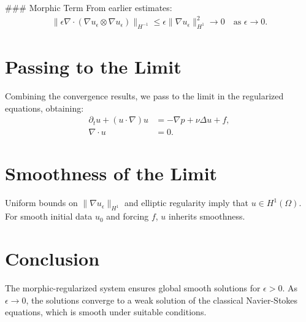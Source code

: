 \documentclass[12pt]{article}
\begin{document}
### Morphic Term
From earlier estimates:
\begin{align}
    \|\epsilon \nabla \cdot (\nabla u_\epsilon \otimes \nabla u_\epsilon)\|_{H^{-1}} \leq \epsilon \|\nabla u_\epsilon\|_{H^1}^2 \to 0 \quad \text{as } \epsilon \to 0.
\end{align}

\section{Passing to the Limit}
Combining the convergence results, we pass to the limit in the regularized equations, obtaining:
\begin{align}
    \partial_t u + (u \cdot \nabla)u &= -\nabla p + \nu \Delta u + f, \\
    \nabla \cdot u &= 0.
\end{align}

\section{Smoothness of the Limit}
Uniform bounds on $\|\nabla u_\epsilon\|_{H^1}$ and elliptic regularity imply that $u \in H^1(\Omega)$. For smooth initial data $u_0$ and forcing $f$, $u$ inherits smoothness.

\section{Conclusion}
The morphic-regularized system ensures global smooth solutions for $\epsilon > 0$. As $\epsilon \to 0$, the solutions converge to a weak solution of the classical Navier-Stokes equations, which is smooth under suitable conditions.
\end{document}
